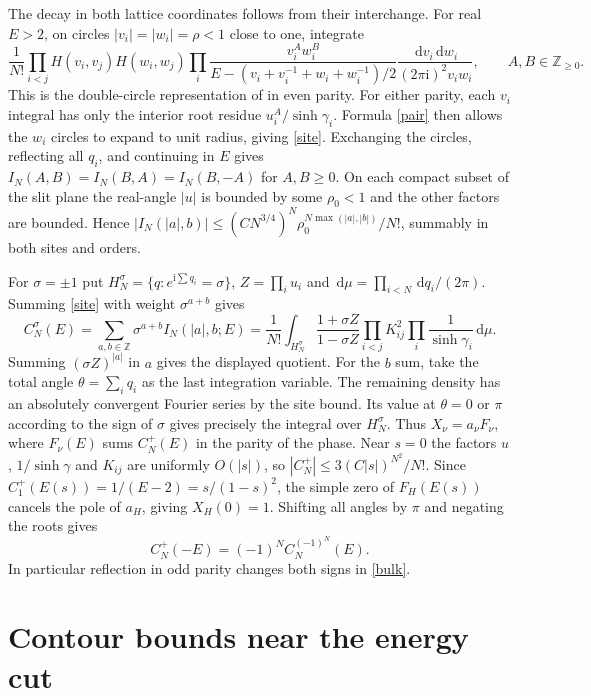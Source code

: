 \documentclass[11pt]{article}
\newcommand{\ii}{\mathrm i}
\newcommand{\dd}{\,\mathrm d}
\newcommand{\Z}{\mathbb Z}
\begin{document}
The decay in both lattice coordinates follows from their interchange.
For real $E>2$, on circles $|v_i|=|w_i|=\rho<1$ close to one, integrate
\[
 \frac1{N!}\prod_{i<j}H(v_i,v_j)H(w_i,w_j)
 \prod_i\frac{v_i^A w_i^B}
 {E-(v_i+v_i^{-1}+w_i+w_i^{-1})/2}
 \frac{\dd v_i\dd w_i}{(2\pi\ii)^2v_iw_i},\qquad A,B\in\Z_{\ge0}.
\]
This is the double-circle representation of \cite[Appendix~1]{TW}
in even parity. For either parity, each $v_i$ integral has only the
interior root residue $u_i^A/\sinh\gamma_i$. Formula \eqref{pair}
then allows the $w_i$ circles to expand to unit radius, giving
\eqref{site}. Exchanging the circles, reflecting all $q_i$, and
continuing in $E$ gives $I_N(A,B)=I_N(B,A)=I_N(B,-A)$ for $A,B\ge0$.
On each compact subset of the slit plane the real-angle $|u|$ is
bounded by some $\rho_0<1$ and the other factors are bounded. Hence
$|I_N(|a|,b)|\le (C N^{3/4})^N\rho_0^{N\max(|a|,|b|)}/N!$, summably
in both sites and orders.

For $\sigma=\pm1$ put $H_N^\sigma=\{q:e^{\ii\sum q_i}=\sigma\}$,
$Z=\prod_i u_i$ and $\dd\mu=\prod_{i<N}\dd q_i/(2\pi)$.
Summing \eqref{site} with weight $\sigma^{a+b}$ gives
\begin{equation}\label{bulk}
 C_N^\sigma(E)=\sum_{a,b\in\Z}\sigma^{a+b}I_N(|a|,b;E)
 =\frac1{N!}\int_{H_N^\sigma}\frac{1+\sigma Z}{1-\sigma Z}
          \prod_{i<j}K_{ij}^2\prod_i\frac1{\sinh\gamma_i}\dd\mu .
\end{equation}
Summing $(\sigma Z)^{|a|}$ in $a$ gives the displayed quotient. For
the $b$ sum, take the total angle $\theta=\sum_i q_i$ as the last
integration variable. The remaining density has an absolutely
convergent Fourier series by the site bound. Its value at $\theta=0$
or $\pi$ according to the sign of $\sigma$ gives precisely the integral
over $H_N^\sigma$.
Thus $X_\nu=a_\nu F_\nu$, where $F_\nu(E)$ sums $C_N^+(E)$ in
the parity of the phase. Near $s=0$ the factors $u$, $1/\sinh\gamma$ and
$K_{ij}$ are uniformly $O(|s|)$, so $|C_N^+|\le3(C|s|)^{N^2}/N!$.
Since $C_1^+(E(s))=1/(E-2)=s/(1-s)^2$, the simple zero of $F_H(E(s))$
cancels the pole of $a_H$, giving $X_H(0)=1$.
Shifting all angles by $\pi$ and negating the roots gives
\begin{equation}\label{reflect}
 C_N^+(-E)=(-1)^N C_N^{(-1)^N}(E).
\end{equation}
In particular reflection in odd parity changes both signs in \eqref{bulk}.

\section{Contour bounds near the energy cut}
\end{document}
